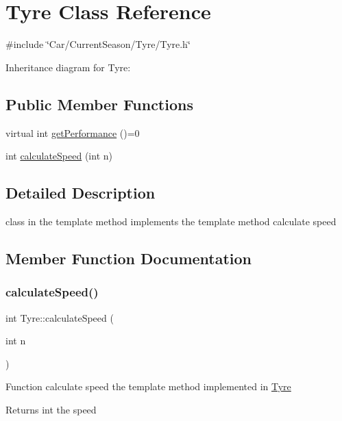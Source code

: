 \hypertarget{classTyre}{}\section{Tyre Class Reference}
\label{classTyre}


{\ttfamily \#include \char`\"{}Car/\+Current\+Season/\+Tyre/\+Tyre.\+h\char`\"{}}



Inheritance diagram for Tyre\+:
\subsection*{Public Member Functions}
\begin{DoxyCompactItemize}
\item 
virtual int \hyperlink{classTyre_a039a0e53d35fb8bb9301e05b13af1478}{get\+Performance} ()=0
\item 
int \hyperlink{classTyre_ad04bc5bbc8382c0777c1770f7604b41b}{calculate\+Speed} (int n)
\end{DoxyCompactItemize}


\subsection{Detailed Description}
class in the template method implements the template method calculate speed 

\subsection{Member Function Documentation}
\mbox{\label{classTyre_ad04bc5bbc8382c0777c1770f7604b41b}} 
\subsubsection{\texorpdfstring{calculate\+Speed()}{calculateSpeed()}}
{\footnotesize\ttfamily int Tyre\+::calculate\+Speed (\begin{DoxyParamCaption}\item[{int}]{n }\end{DoxyParamCaption})}

Function calculate speed the template method implemented in \hyperlink{classTyre}{Tyre} \begin{DoxyReturn}{Returns}
int the speed 
\end{DoxyReturn}

